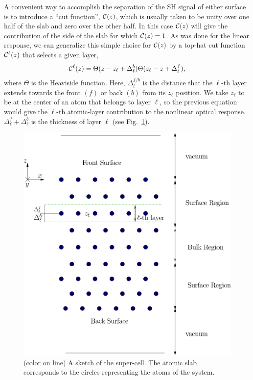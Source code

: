 \documentclass[floatfix,prb,aps,superscriptaddress,showpacs,11pt,preprint,letterpaper]{revtex4}
\begin{document}
A convenient way to accomplish the separation of the SH signal of
either surface is to introduce a ``cut function'', ${\mathbf{\cal C}}(z)$, which is 
usually taken to be unity over one half of the slab and zero over 
the other half.\cite{reiningPRB94}
In this case ${\mathbf{\cal C}}(z)$ will give the contribution of the 
side of the slab for which ${\mathbf{\cal C}}(z)=1$. 
As was done for the linear response,\cite{mendozaPRB06}
we can generalize this 
simple choice for ${\mathbf{\cal C}}(z)$ by a top-hat cut function
${\mathbf{\cal C}}^\ell(z)$ that selects a given layer,
\begin{equation}
{\mathbf{\cal C}}^\ell(z)=\Theta(z-z_\ell+\Delta_\ell^{b})  
            \Theta(z_\ell-z+\Delta_\ell^f),
\label{sz}
\end{equation} 
where $\Theta$ is the Heaviside function. Here, $\Delta_\ell^{f/b}$
is the distance that the $\ell$-th layer extends towards the front
$(f)$ or back $(b)$ from its $z_\ell$ position. 
We take $z_\ell$ to be at the center of an atom that 
belongs to layer $\ell$, so the previous
equation would give the $\ell$-th atomic-layer 
contribution to the nonlinear optical response.
$\Delta_\ell^f+\Delta_\ell^b$ is the thickness of layer $\ell$ 
(see Fig.~\ref{fslab}).
\begin{figure}
\centering
\includegraphics[scale=.7]{fig1}
\caption{(color on line) A sketch of the super-cell. 
The atomic slab corresponds to the
circles representing the atoms of the system.
\label{fslab}} 
\end{figure}
\end{document}
